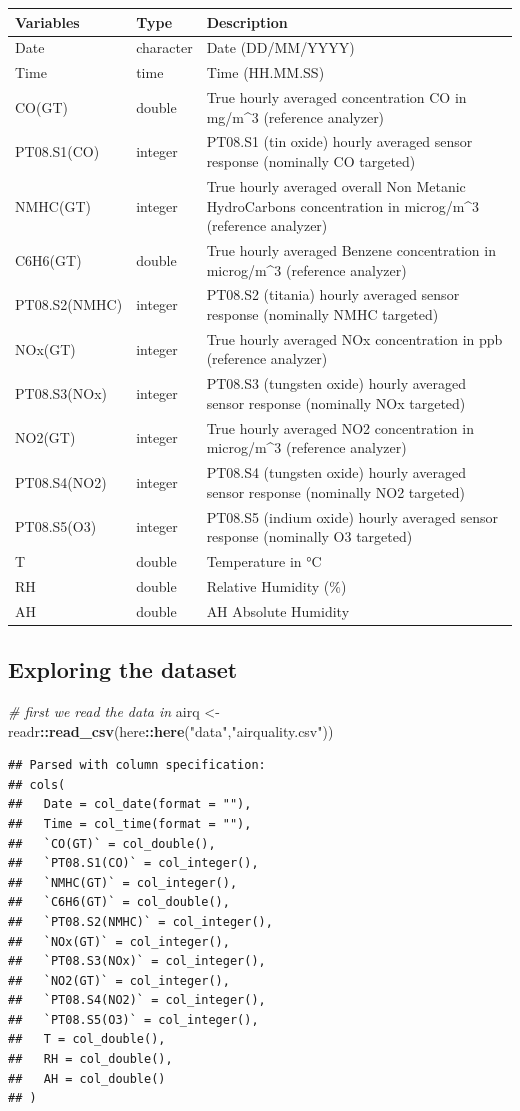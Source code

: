 \documentclass[]{article}
\newenvironment{Shaded}{\begin{snugshade}}{\end{snugshade}}
\newcommand{\CommentTok}[1]{\textcolor[rgb]{0.56,0.35,0.01}{\textit{#1}}}
\newcommand{\KeywordTok}[1]{\textcolor[rgb]{0.13,0.29,0.53}{\textbf{#1}}}
\newcommand{\NormalTok}[1]{#1}
\newcommand{\OperatorTok}[1]{\textcolor[rgb]{0.81,0.36,0.00}{\textbf{#1}}}
\newcommand{\StringTok}[1]{\textcolor[rgb]{0.31,0.60,0.02}{#1}}
\begin{document}
\begin{longtable}[]{@{}lll@{}}
\toprule
Variables & Type & Description\tabularnewline
\midrule
\endhead
Date & character & Date (DD/MM/YYYY)\tabularnewline
Time & time & Time (HH.MM.SS)\tabularnewline
CO(GT) & double & True hourly averaged concentration CO in mg/m\^{}3
(reference analyzer)\tabularnewline
PT08.S1(CO) & integer & PT08.S1 (tin oxide) hourly averaged sensor
response (nominally CO targeted)\tabularnewline
NMHC(GT) & integer & True hourly averaged overall Non Metanic
HydroCarbons concentration in microg/m\^{}3 (reference
analyzer)\tabularnewline
C6H6(GT) & double & True hourly averaged Benzene concentration in
microg/m\^{}3 (reference analyzer)\tabularnewline
PT08.S2(NMHC) & integer & PT08.S2 (titania) hourly averaged sensor
response (nominally NMHC targeted)\tabularnewline
NOx(GT) & integer & True hourly averaged NOx concentration in ppb
(reference analyzer)\tabularnewline
PT08.S3(NOx) & integer & PT08.S3 (tungsten oxide) hourly averaged sensor
response (nominally NOx targeted)\tabularnewline
NO2(GT) & integer & True hourly averaged NO2 concentration in
microg/m\^{}3 (reference analyzer)\tabularnewline
PT08.S4(NO2) & integer & PT08.S4 (tungsten oxide) hourly averaged sensor
response (nominally NO2 targeted)\tabularnewline
PT08.S5(O3) & integer & PT08.S5 (indium oxide) hourly averaged sensor
response (nominally O3 targeted)\tabularnewline
T & double & Temperature in °C\tabularnewline
RH & double & Relative Humidity (\%)\tabularnewline
AH & double & AH Absolute Humidity\tabularnewline
\bottomrule
\end{longtable}

\hypertarget{exploring-the-dataset}{%
\subsection{Exploring the dataset}\label{exploring-the-dataset}}

\begin{Shaded}
\begin{Highlighting}[]
\CommentTok{# first we read the data in}
\NormalTok{airq <-}\StringTok{ }\NormalTok{readr}\OperatorTok{::}\KeywordTok{read_csv}\NormalTok{(here}\OperatorTok{::}\KeywordTok{here}\NormalTok{(}\StringTok{"data"}\NormalTok{,}\StringTok{"airquality.csv"}\NormalTok{))}
\end{Highlighting}
\end{Shaded}

\begin{verbatim}
## Parsed with column specification:
## cols(
##   Date = col_date(format = ""),
##   Time = col_time(format = ""),
##   `CO(GT)` = col_double(),
##   `PT08.S1(CO)` = col_integer(),
##   `NMHC(GT)` = col_integer(),
##   `C6H6(GT)` = col_double(),
##   `PT08.S2(NMHC)` = col_integer(),
##   `NOx(GT)` = col_integer(),
##   `PT08.S3(NOx)` = col_integer(),
##   `NO2(GT)` = col_integer(),
##   `PT08.S4(NO2)` = col_integer(),
##   `PT08.S5(O3)` = col_integer(),
##   T = col_double(),
##   RH = col_double(),
##   AH = col_double()
## )
\end{verbatim}
\end{document}
